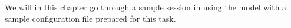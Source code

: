 %
%

We will in this chapter go through a sample session in using the model with
a sample configuration file prepared for this task.
